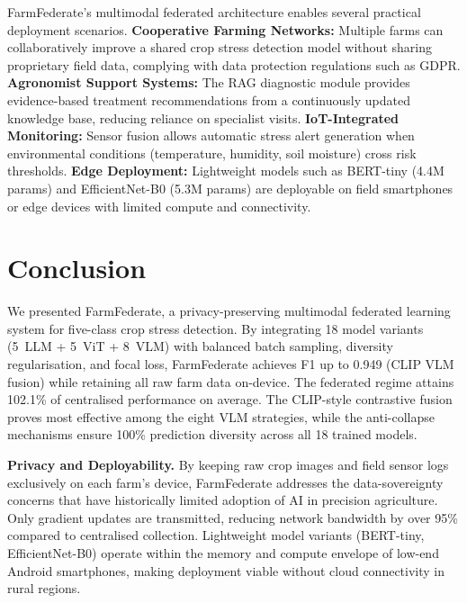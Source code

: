 \documentclass[conference]{IEEEtran}
\begin{document}
FarmFederate's multimodal federated architecture enables several practical deployment
scenarios. \textbf{Cooperative Farming Networks:} Multiple farms can collaboratively
improve a shared crop stress detection model without sharing proprietary field data,
complying with data protection regulations such as GDPR. \textbf{Agronomist Support
Systems:} The RAG diagnostic module provides evidence-based treatment recommendations
from a continuously updated knowledge base, reducing reliance on specialist visits.
\textbf{IoT-Integrated Monitoring:} Sensor fusion allows automatic stress alert
generation when environmental conditions (temperature, humidity, soil moisture) cross
risk thresholds. \textbf{Edge Deployment:} Lightweight models such as BERT-tiny
(4.4M params) and EfficientNet-B0 (5.3M params) are deployable on field smartphones
or edge devices with limited compute and connectivity.

\section{Conclusion}
\label{sec:conc}

We presented FarmFederate, a privacy-preserving multimodal federated learning system
for five-class crop stress detection. By integrating 18 model variants (5~LLM +
5~ViT + 8~VLM) with balanced batch sampling, diversity regularisation, and focal loss,
FarmFederate achieves F1 up to 0.949 (CLIP VLM fusion) while retaining all raw farm
data on-device. The federated regime attains 102.1\% of centralised performance on
average. The CLIP-style contrastive fusion proves most effective among the eight VLM
strategies, while the anti-collapse mechanisms ensure 100\% prediction diversity across
all 18 trained models.

\textbf{Privacy and Deployability.} By keeping raw crop images and field sensor logs
exclusively on each farm's device, FarmFederate addresses the data-sovereignty concerns
that have historically limited adoption of AI in precision agriculture. Only gradient
updates are transmitted, reducing network bandwidth by over 95\% compared to centralised
collection. Lightweight model variants (BERT-tiny, EfficientNet-B0) operate within the
memory and compute envelope of low-end Android smartphones, making deployment viable
without cloud connectivity in rural regions.
\end{document}

